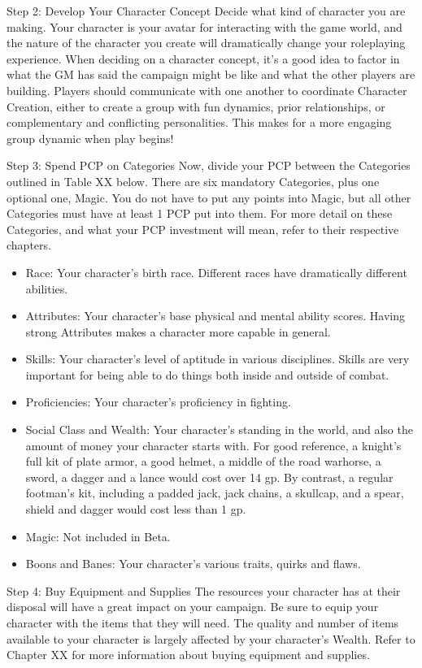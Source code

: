\documentclass[oneside,11pt,english]{book}
\begin{document}
Step 2: Develop Your Character Concept 
Decide what kind of character you are making. Your character is your avatar for interacting with the game 
world, and the nature of the character you create will dramatically change your roleplaying experience. 
When deciding on a character concept, it’s a good idea to factor in what the GM has said the campaign 
might be like and what the other players are building. Players should communicate with one another to 
coordinate Character Creation, either to create a group with fun dynamics, prior relationships, or 
complementary and conflicting personalities. This makes for a more engaging group dynamic when play 
begins! 
 

Step 3: Spend PCP on Categories 
Now, divide your PCP between the Categories outlined in Table XX below. There are six mandatory 
Categories, plus one optional one, Magic. You do not have to put any points into Magic, but all other 
Categories must have at least 1 PCP put into them. For more detail on these Categories, and what your 
PCP investment will mean, refer to their respective chapters. 

 
\begin{itemize}
\item Race: Your character’s birth race. Different races have dramatically different abilities. 
\item Attributes: Your character’s base physical and mental ability scores. Having strong Attributes makes a character more capable in general. 
\item Skills: Your character’s level of aptitude in various disciplines. Skills are very important for being able to do things both inside and outside of combat. 
\item Proficiencies: Your character’s proficiency in fighting. 
\item Social Class and Wealth: Your character’s standing in the world, and also the amount of money your character starts with. For good reference, a knight’s full kit of plate armor, a good helmet, a middle of the road warhorse, a sword, a dagger and a lance would cost over 14 gp. By contrast, a regular footman’s kit, including a padded jack, jack chains, a skullcap, and a spear, shield and dagger would cost less than 1 gp. 
\item Magic: Not included in Beta. 
\item Boons and Banes: Your character’s various traits, quirks and flaws. 
\end{itemize}
 

Step 4: Buy Equipment and Supplies 
The resources your character has at their disposal will have a great impact on your campaign. Be sure to 
equip your character with the items that they will need. The quality and number of items available to your 
character is largely affected by your character’s Wealth. Refer to Chapter XX for more information about 
buying equipment and supplies. 
\end{document}
